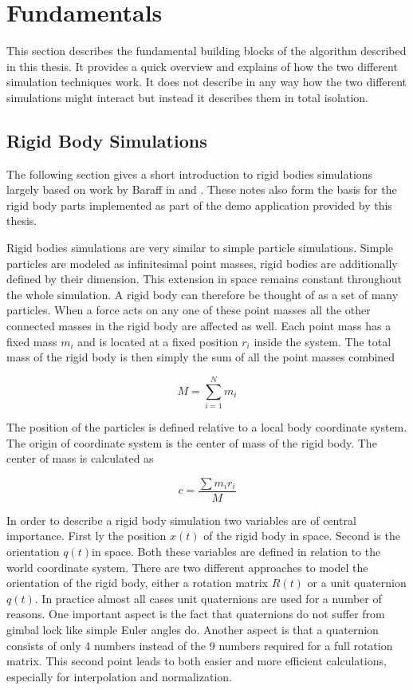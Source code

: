 \chapter{Fundamentals}
\label{cha:fundamentals}

This section describes the fundamental building blocks of the algorithm described in this thesis. It provides a quick overview and explains of how the two different simulation techniques work. It does not describe in any way how the two different simulations might interact but instead it describes them in total isolation.

\section{Rigid Body Simulations}
\label{sec:rigid_body_simulations}

The following section gives a short introduction to rigid bodies simulations largely based on work by Baraff in \cite{Baraff:1997uh} and \cite{Baraff:1997wq}. These notes also form the basis for the rigid body parts implemented as part of the demo application provided by this thesis.

Rigid bodies simulations are very similar to simple particle simulations. Simple particles are modeled as infinitesimal point masses, rigid bodies are additionally defined by their dimension. This extension in space remains constant throughout the whole simulation. A rigid body can therefore be thought of as a set of many particles. When a force acts on any one of these point masses all the other connected masses in the rigid body are affected as well. Each point mass has a fixed mass $m_i$ and is located at a fixed position $r_i$ inside the system. The total mass of the rigid body is then simply the sum of all the point masses combined

\begin{equation}
M = \sum\limits_{i=1}^N m_i
\end{equation}

The position of the particles is defined relative to a local body coordinate system. The origin of coordinate system is the center of mass of the rigid body. The center of mass is calculated as 

\begin{equation}
c = \frac{\sum m_i r_i}{M}
\end{equation}

In order to describe a rigid body simulation two variables are of central importance. First ly the position \(x(t)\) of the rigid body in space. Second is the orientation \(q(t)\)in space. Both these variables are defined in relation to the world coordinate system. There are two different approaches to model the orientation of the rigid body, either a rotation matrix $R(t)$ or a unit quaternion $q(t)$. In practice almost all cases unit quaternions are used for a number of reasons. One important aspect is the fact that quaternions do not suffer from gimbal lock like simple Euler angles do. Another aspect is that a quaternion consists of only 4 numbers instead of the 9 numbers required for a full rotation matrix. This second point leads to both easier and more efficient calculations, especially for interpolation and normalization.

